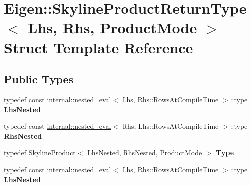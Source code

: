 \hypertarget{struct_eigen_1_1_skyline_product_return_type}{}\section{Eigen\+:\+:Skyline\+Product\+Return\+Type$<$ Lhs, Rhs, Product\+Mode $>$ Struct Template Reference}
\label{struct_eigen_1_1_skyline_product_return_type}
\subsection*{Public Types}
\begin{DoxyCompactItemize}
\item 
\mbox{\label{struct_eigen_1_1_skyline_product_return_type_a873d4c2cca5f6c4853c26bc91f486be6}} 
typedef const \hyperlink{struct_eigen_1_1internal_1_1nested__eval}{internal\+::nested\+\_\+eval}$<$ Lhs, Rhs\+::\+Rows\+At\+Compile\+Time $>$\+::type {\bfseries Lhs\+Nested}
\item 
\mbox{\label{struct_eigen_1_1_skyline_product_return_type_a8a3f6b6b3c070e7ccf8dc7f7f3de368a}} 
typedef const \hyperlink{struct_eigen_1_1internal_1_1nested__eval}{internal\+::nested\+\_\+eval}$<$ Rhs, Lhs\+::\+Rows\+At\+Compile\+Time $>$\+::type {\bfseries Rhs\+Nested}
\item 
\mbox{\label{struct_eigen_1_1_skyline_product_return_type_a09b96c5c616f93dde2a8d7e1b61599ad}} 
typedef \hyperlink{class_eigen_1_1_skyline_product}{Skyline\+Product}$<$ \hyperlink{class_eigen_1_1internal_1_1_tensor_lazy_evaluator_writable}{Lhs\+Nested}, \hyperlink{class_eigen_1_1internal_1_1_tensor_lazy_evaluator_writable}{Rhs\+Nested}, Product\+Mode $>$ {\bfseries Type}
\item 
\mbox{\label{struct_eigen_1_1_skyline_product_return_type_a873d4c2cca5f6c4853c26bc91f486be6}} 
typedef const \hyperlink{struct_eigen_1_1internal_1_1nested__eval}{internal\+::nested\+\_\+eval}$<$ Lhs, Rhs\+::\+Rows\+At\+Compile\+Time $>$\+::type {\bfseries Lhs\+Nested}
\item 
\mbox{\label{struct_eigen_1_1_skyline_product_return_type_a8a3f6b6b3c070e7ccf8dc7f7f3de368a}} 

\end{DoxyCompactItemize}
